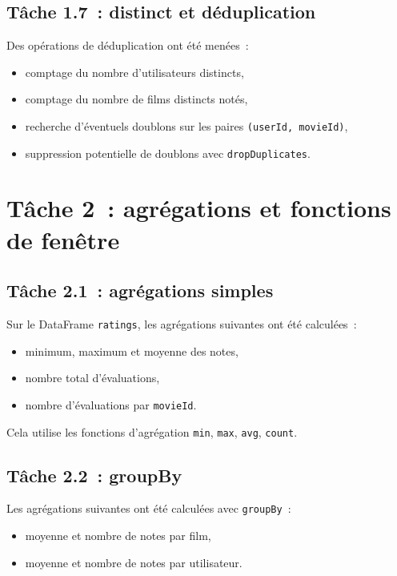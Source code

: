 \documentclass[a4paper,11pt]{article}
\begin{document}
\subsection{Tâche 1.7~: distinct et déduplication}

Des opérations de déduplication ont été menées~:
\begin{itemize}
  \item comptage du nombre d'utilisateurs distincts,
  \item comptage du nombre de films distincts notés,
  \item recherche d'éventuels doublons sur les paires
        \texttt{(userId, movieId)},
  \item suppression potentielle de doublons avec
        \texttt{dropDuplicates}.
\end{itemize}

\section{Tâche 2~: agrégations et fonctions de fenêtre}

\subsection{Tâche 2.1~: agrégations simples}

Sur le DataFrame \texttt{ratings}, les agrégations suivantes
ont été calculées~:
\begin{itemize}
  \item minimum, maximum et moyenne des notes,
  \item nombre total d'évaluations,
  \item nombre d'évaluations par \texttt{movieId}.
\end{itemize}

Cela utilise les fonctions d'agrégation \texttt{min}, \texttt{max},
\texttt{avg}, \texttt{count}.

\subsection{Tâche 2.2~: groupBy}

Les agrégations suivantes ont été calculées avec \texttt{groupBy}~:
\begin{itemize}
  \item moyenne et nombre de notes par film,
  \item moyenne et nombre de notes par utilisateur.
\end{itemize}
\end{document}
